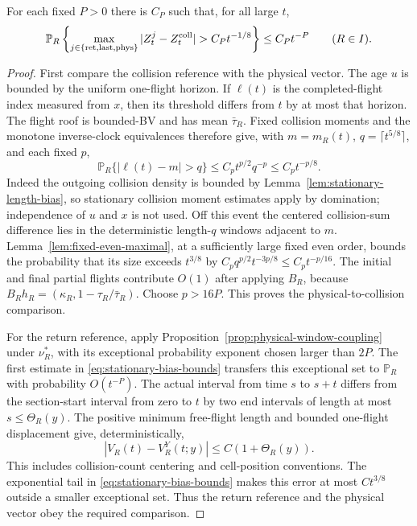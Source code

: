 \begin{proposition}
\label{prop:stationary-observation-coupling}
For each fixed $P>0$ there is $C_P$ such that, for all large $t$,
\begin{equation}\label{eq:stationary-observation-coupling}
 \mathbb P_R\left\{\max_{j\in\{{\rm ret},{\rm last},{\rm phys}\}}
 |Z_t^j-Z_t^{\rm coll}|>C_Pt^{-1/8}\right\}\le C_Pt^{-P}
 \qquad(R\in I).
\end{equation}
\end{proposition}
\begin{proof}
First compare the collision reference with the physical vector.
The age $u$ is bounded by the uniform one-flight horizon. If
$\ell(t)$ is the completed-flight index measured from $x$, then
its threshold differs from $t$ by at most that horizon. The flight
roof is bounded-BV and has mean $\bar\tau_R$. Fixed collision
moments and the monotone inverse-clock equivalences therefore give,
with $m=m_R(t)$, $q=\lceil t^{5/8}\rceil$, and each fixed $p$,
\[
 \mathbb P_R\{|\ell(t)-m|>q\}\le C_p t^{p/2}q^{-p}
                                            \le C_pt^{-p/8}.
\]
Indeed the outgoing collision density is bounded by
Lemma~\ref{lem:stationary-length-bias}, so stationary collision
moment estimates apply by domination; independence of $u$ and $x$
is not used. Off this event the centered collision-sum difference
lies in the deterministic length-$q$ windows adjacent to $m$.
Lemma~\ref{lem:fixed-even-maximal}, at a sufficiently large fixed
even order, bounds the probability that its size exceeds $t^{3/8}$
by $C_p q^{p/2}t^{-3p/8}\le C_pt^{-p/16}$.
The initial and final partial flights contribute $O(1)$ after applying
$B_R$, because $B_Rh_R=(\kappa_R,1-\tau_R/\bar\tau_R)$.
Choose $p>16P$. This proves the physical-to-collision comparison.

For the return reference, apply
Proposition~\ref{prop:physical-window-coupling} under $\nu_R^*$,
with its exceptional probability exponent chosen larger than $2P$.
The first estimate in \eqref{eq:stationary-bias-bounds} transfers
this exceptional set to $\mathbb P_R$ with probability $O(t^{-P})$.
The actual interval from time $s$ to $s+t$ differs from the
section-start interval from zero to $t$ by two end intervals of
length at most $s\le\Theta_R(y)$. The positive minimum free-flight
length and bounded one-flight displacement give, deterministically,
\[
 |V_R(t)-V_R^Y(t;y)|\le C(1+\Theta_R(y)).
\]
This includes collision-count centering and cell-position conventions.
The exponential tail in \eqref{eq:stationary-bias-bounds} makes this
error at most $Ct^{3/8}$ outside a smaller exceptional set. Thus the
return reference and the physical vector obey the required comparison.


\end{proof}
